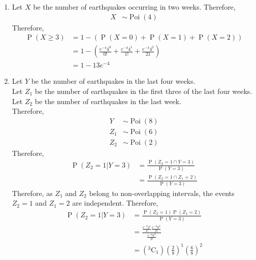 \documentclass[titlepage, fleqn, a4paper, 12pt, twoside]{article}
\theoremstyle{definition}
\theoremstyle{theorem}
\DeclareMathOperator{\prob}{\mathrm{P}}
\DeclareMathOperator{\poi}{\mathrm{Poi}}
\newcommand*{\comb}[2]{{}^{#1}\mathrm{C}_{#2}}%
\begin{document}
\begin{solution}
	\begin{enumerate}[leftmargin=*]
		\item
			Let $X$ be the number of earthquakes occurring in two weeks.
			Therefore,
			\begin{align*}
				X & \sim \poi(4)
			\end{align*}
			Therefore,
			\begin{align*}
				\prob(X \ge 3) & = 1 - \left( \prob(X = 0) + \prob(X = 1) + \prob(X = 2) \right)                            \\
                                               & = 1 - \left( \frac{e^{-4} 4^0}{0!} + \frac{e^{-4} 4^1}{1!} + \frac{e^{-4} 4^2}{21} \right) \\
                                               & = 1 - 13 e^{-4}
			\end{align*}
		\item
			Let $Y$ be the number of earthquakes in the last four weeks.\\
			Let $Z_1$ be the number of earthquakes in the first three of the last four weeks.\\
			Let $Z_2$ be the number of earthquakes in the last week.\\
			Therefore,
			\begin{align*}
				Y   & \sim \poi(8) \\
				Z_1 & \sim \poi(6) \\
				Z_2 & \sim \poi(2)
			\end{align*}
			Therefore,
			\begin{align*}
				\prob(Z_2 = 1 | Y = 3) & = \frac{\prob(Z_2 = 1 \cap Y = 3)}{\prob(Y = 3)} \\
                                                       & = \frac{\prob(Z_2 = 1 \cap Z_1 = 2)}{\prob(Y = 3)}
			\end{align*}
			Therefore, as $Z_1$ and $Z_2$ belong to non-overlapping intervals, the events $Z_2 = 1$ and $Z_1 = 2$ are independent.
			Therefore,
			\begin{align*}
				\prob(Z_2 = 1 | Y = 3) & = \frac{\prob(Z_2 = 1) \prob(Z_1 = 2)}{\prob(Y = 3)}                        \\
                                                       & = \frac{\frac{e^{-2} 2^1}{1!} \frac{e^{-6} 6^2}{2!}}{\frac{e^{-8} 8^3}{3!}} \\
                                                       & = \left( \comb{3}{1} \right) \left( \frac{2}{8} \right)^1 \left( \frac{6}{8} \right)^2
			\end{align*}
	\end{enumerate}
\end{solution}
\end{document}
